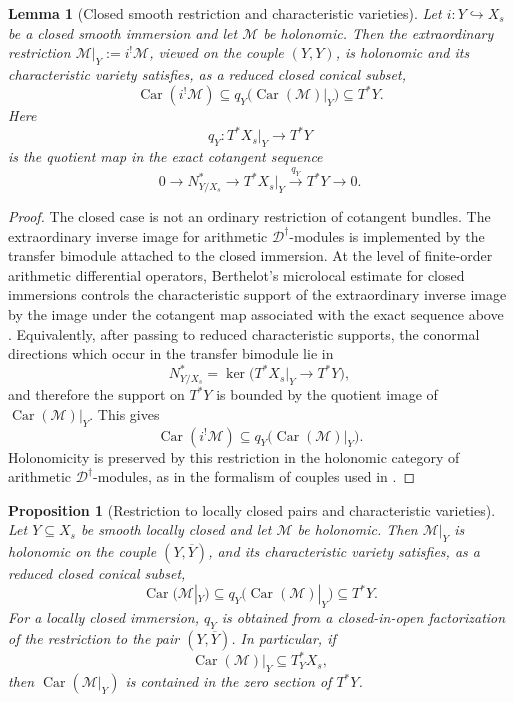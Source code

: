 \documentclass[11pt]{amsart}
\theoremstyle{plain}
\newtheorem{proposition}{Proposition}[section]
\newtheorem{lemma}{Lemma}[section]
\theoremstyle{definition}
\theoremstyle{remark}
\newcommand{\Car}{\operatorname{Car}}
\begin{document}
\begin{lemma}[Closed smooth restriction and characteristic varieties]
\label{lem:closed-restriction-characteristic}
Let \(i:Y\hookrightarrow X_s\) be a closed smooth immersion and let
\(\mathcal M\) be holonomic. Then the extraordinary restriction
\(\mathcal M|_Y:=i^!\mathcal M\), viewed on the couple \((Y,Y)\), is
holonomic and its characteristic variety satisfies, as a reduced closed
conical subset,
\[
  \Car(i^!\mathcal M)
  \subseteq
  q_Y\bigl(\Car(\mathcal M)|_Y\bigr)
  \subseteq T^*Y.
\]
Here
\[
  q_Y:T^*X_s|_Y\longrightarrow T^*Y
\]
is the quotient map in the exact cotangent sequence
\[
  0\longrightarrow N^*_{Y/X_s}
  \longrightarrow T^*X_s|_Y
  \xrightarrow{\ q_Y\ }
  T^*Y
  \longrightarrow 0.
\]
\end{lemma}

\begin{proof}
The closed case is not an ordinary restriction of cotangent bundles. The
extraordinary inverse image for arithmetic \(\mathscr D^\dagger\)-modules is
implemented by the transfer bimodule attached to the closed immersion. At the
level of finite-order arithmetic differential operators, Berthelot's
microlocal estimate for closed immersions controls the characteristic support
of the extraordinary inverse image by the image under the cotangent map
associated with the exact sequence above \cite[5.3.3]{BerthelotIntro}.
Equivalently, after passing to reduced characteristic supports, the conormal
directions which occur in the transfer bimodule lie in
\[
  N^*_{Y/X_s}=\ker\bigl(T^*X_s|_Y\to T^*Y\bigr),
\]
and therefore the support on \(T^*Y\) is bounded by the quotient image of
\(\Car(\mathcal M)|_Y\). This gives
\[
  \Car(i^!\mathcal M)
  \subseteq
  q_Y\bigl(\Car(\mathcal M)|_Y\bigr).
\]
Holonomicity is preserved by this restriction in the holonomic category of
arithmetic \(\mathscr D^\dagger\)-modules, as in the formalism of couples used
in \cite[\S2.1, Definition 2.1.3 and Theorem 2.1.4]{HuygheSchmidtIntermediate}.
\end{proof}

\begin{proposition}[Restriction to locally closed pairs and characteristic varieties]
\label{prop:restriction-characteristic}
Let \(Y\subseteq X_s\) be smooth locally closed and let \(\mathcal M\) be
holonomic. Then \(\mathcal M|_Y\) is holonomic on the couple
\((Y,\overline Y)\), and its characteristic variety satisfies, as a reduced
closed conical subset,
\[
  \Car(\mathcal M|_Y)
  \subseteq
  q_Y\bigl(\Car(\mathcal M)|_Y\bigr)
  \subseteq T^*Y.
\]
For a locally closed immersion, \(q_Y\) is obtained from a
closed-in-open factorization of the restriction to the pair
\((Y,\overline Y)\). In particular, if
\[
  \Car(\mathcal M)|_Y\subseteq T^*_Y X_s,
\]
then \(\Car(\mathcal M|_Y)\) is contained in the zero section of \(T^*Y\).
\end{proposition}
\end{document}
